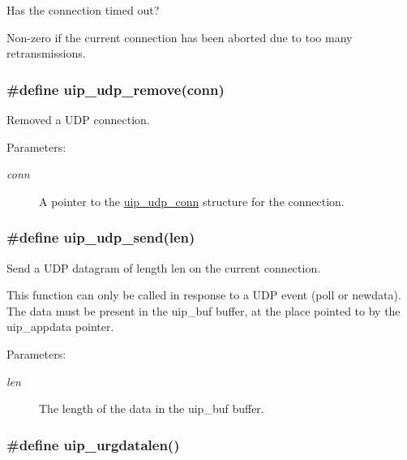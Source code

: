 Has the connection timed out? 

Non-zero if the current connection has been aborted due to too many retransmissions. \hypertarget{a00064_gf2dbaceb10c67783a115075b5b6d66df}{
\subsubsection[uip\_\-udp\_\-remove]{\setlength{\rightskip}{0pt plus 5cm}\#define uip\_\-udp\_\-remove(conn)}}
\label{a00064_gf2dbaceb10c67783a115075b5b6d66df}


Removed a UDP connection. 

\begin{Desc}
\item[Parameters:]
\begin{description}
\item[{\em conn}]A pointer to the \hyperlink{a00032}{uip\_\-udp\_\-conn} structure for the connection. \end{description}
\end{Desc}
\hypertarget{a00064_ge5ab69d40013e6cf86ef1763c95d920e}{
\subsubsection[uip\_\-udp\_\-send]{\setlength{\rightskip}{0pt plus 5cm}\#define uip\_\-udp\_\-send(len)}}
\label{a00064_ge5ab69d40013e6cf86ef1763c95d920e}


Send a UDP datagram of length len on the current connection. 

This function can only be called in response to a UDP event (poll or newdata). The data must be present in the uip\_\-buf buffer, at the place pointed to by the uip\_\-appdata pointer.

\begin{Desc}
\item[Parameters:]
\begin{description}
\item[{\em len}]The length of the data in the uip\_\-buf buffer. \end{description}
\end{Desc}
\hypertarget{a00064_g8411c95a4d89367ad2d9d6bde1a3d537}{
\subsubsection[uip\_\-urgdatalen]{\setlength{\rightskip}{0pt plus 5cm}\#define uip\_\-urgdatalen()}}
\label{a00064_g8411c95a4d89367ad2d9d6bde1a3d537}


